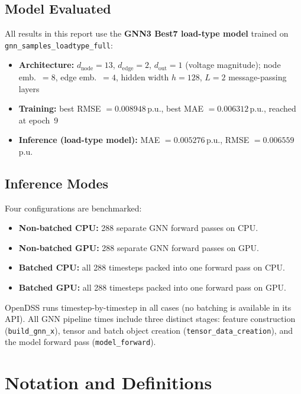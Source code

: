 \documentclass[11pt]{article}
\begin{document}
\subsection{Model Evaluated}

All results in this report use the \textbf{GNN3 Best7 load-type model} trained
on \texttt{gnn\_samples\_loadtype\_full}:

\begin{itemize}
  \item \textbf{Architecture:} $d_{\text{node}}=13$, $d_{\text{edge}}=2$,
        $d_{\text{out}}=1$ (voltage magnitude);
        node emb.\ $= 8$, edge emb.\ $= 4$,
        hidden width $h = 128$, $L = 2$ message-passing layers
  \item \textbf{Training:} best RMSE $= 0.008948$\,p.u.,
        best MAE $= 0.006312$\,p.u., reached at epoch~9
  \item \textbf{Inference (load-type model):} MAE $= 0.005276$\,p.u.,
        RMSE $= 0.006559$\,p.u.
\end{itemize}

\subsection{Inference Modes}

Four configurations are benchmarked:

\begin{itemize}
  \item \textbf{Non-batched CPU:} 288 separate GNN forward passes on CPU.
  \item \textbf{Non-batched GPU:} 288 separate GNN forward passes on GPU.
  \item \textbf{Batched CPU:} all 288 timesteps packed into one forward pass on CPU.
  \item \textbf{Batched GPU:} all 288 timesteps packed into one forward pass on GPU.
\end{itemize}

OpenDSS runs timestep-by-timestep in all cases (no batching is available in
its API).  All GNN pipeline times include three distinct stages: feature
construction (\texttt{build\_gnn\_x}), tensor and batch object creation
(\texttt{tensor\_data\_creation}), and the model forward pass
(\texttt{model\_forward}).

\section{Notation and Definitions}
\end{document}
